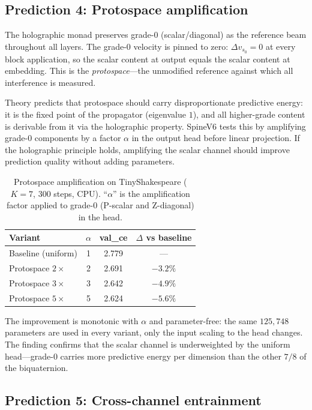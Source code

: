 \documentclass[11pt,a4paper]{article}
\theoremstyle{plain}
\theoremstyle{definition}
\theoremstyle{remark}
\numberwithin{equation}{section}
\begin{document}
\subsection{Prediction 4: Protospace amplification}

The holographic monad preserves grade-$0$ (scalar/diagonal) as
the reference beam throughout all layers.  The grade-$0$ velocity is
pinned to zero: $\Delta v_{s_0} = 0$ at every block application,
so the scalar content at output equals the scalar content at
embedding.  This is the \emph{protospace}---the unmodified
reference against which all interference is measured.

Theory predicts that protospace should carry disproportionate
predictive energy: it is the fixed point of the propagator
(eigenvalue $1$), and all higher-grade content is derivable from
it via the holographic property.  SpineV6 tests this by amplifying
grade-$0$ components by a factor $\alpha$ in the output head
before linear projection.  If the holographic principle holds,
amplifying the scalar channel should improve prediction quality
without adding parameters.

\begin{table}[ht]
\centering
\caption{Protospace amplification on TinyShakespeare ($K = 7$,
$300$ steps, CPU).  ``$\alpha$'' is the amplification factor
applied to grade-$0$ (P-scalar and Z-diagonal) in the head.}
\label{tab:protospace}
\renewcommand{\arraystretch}{1.2}
\small
\begin{tabular}{l c c c}
\toprule
\textbf{Variant} & $\alpha$ & \textbf{val\_ce} & \textbf{$\Delta$ vs baseline} \\
\midrule
Baseline (uniform)     & 1 & 2.779 & --- \\
Protospace $2\times$   & 2 & 2.691 & $-3.2\%$ \\
Protospace $3\times$   & 3 & 2.642 & $-4.9\%$ \\
Protospace $5\times$   & 5 & 2.624 & $-5.6\%$ \\
\bottomrule
\end{tabular}
\end{table}

The improvement is monotonic with $\alpha$ and parameter-free: the
same $125{,}748$ parameters are used in every variant, only the
input scaling to the head changes.  The finding confirms that the
scalar channel is underweighted by the uniform head---grade-$0$
carries more predictive energy per dimension than the other $7/8$
of the biquaternion.

\subsection{Prediction 5: Cross-channel entrainment}
\end{document}
